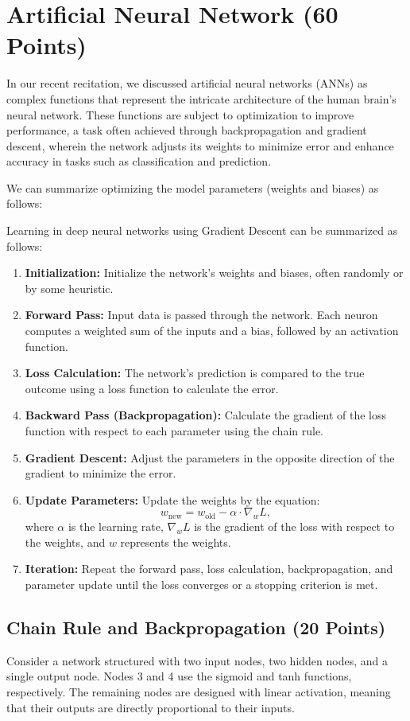 \documentclass{article}
\begin{document}
\section{Artificial Neural Network (60 Points)}
In our recent recitation, we discussed artificial neural networks (ANNs) as complex functions that represent the intricate architecture of the human brain’s neural network. These functions are subject to optimization to improve performance, a task often achieved through backpropagation and gradient descent, wherein the network adjusts its weights to minimize error and enhance accuracy in tasks such as classification and prediction.

We can summarize optimizing the model parameters (weights and biases) as follows:

Learning in deep neural networks using Gradient Descent can be summarized as follows:
\begin{enumerate}
    \item \textbf{Initialization:} Initialize the network’s weights and biases, often randomly or by some heuristic.
    \item \textbf{Forward Pass:} Input data is passed through the network. Each neuron computes a weighted sum of the inputs and a bias, followed by an activation function.
    \item \textbf{Loss Calculation:} The network’s prediction is compared to the true outcome using a loss function to calculate the error.
    \item \textbf{Backward Pass (Backpropagation):} Calculate the gradient of the loss function with respect to each parameter using the chain rule.
    \item \textbf{Gradient Descent:} Adjust the parameters in the opposite direction of the gradient to minimize the error.
    \item \textbf{Update Parameters:} Update the weights by the equation:
    \[
    w_{\text{new}} = w_{\text{old}} - \alpha \cdot \nabla_w L,
    \]
    where $\alpha$ is the learning rate, $\nabla_w L$ is the gradient of the loss with respect to the weights, and $w$ represents the weights.
    \item \textbf{Iteration:} Repeat the forward pass, loss calculation, backpropagation, and parameter update until the loss converges or a stopping criterion is met.
\end{enumerate}

\subsection{Chain Rule and Backpropagation (20 Points)}
Consider a network structured with two input nodes, two hidden nodes, and a single output node. Nodes 3 and 4 use the sigmoid and tanh functions, respectively. The remaining nodes are designed with linear activation, meaning that their outputs are directly proportional to
their inputs.
\end{document}
